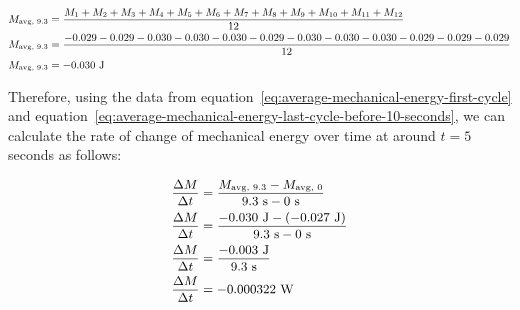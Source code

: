 \documentclass[titlepage]{article}
\begin{document}
            
            \begin{equation}
                \small
                \begin{aligned}
                    M_{\text{avg, 9.3}} &= \frac{M_1 + M_2 + M_3 + M_4 + M_5 + M_6 + M_7 + M_8 + M_9 + M_{10} + M_{11} + M_{12}}{12} \\
                    M_{\text{avg, 9.3}} &= \frac{-0.029 -0.029 -0.030 -0.030 -0.030 -0.029 -0.030 -0.030 -0.030 -0.029 -0.029 -0.029}{12} \\
                    M_{\text{avg, 9.3}} &= -0.030 \text{ J} \\
                \end{aligned}\label{eq:average-mechanical-energy-last-cycle-before-10-seconds}
            \end{equation}
            
            Therefore, using the data from equation~\ref{eq:average-mechanical-energy-first-cycle} and equation~\ref{eq:average-mechanical-energy-last-cycle-before-10-seconds}, we can calculate the rate of change of mechanical energy over time at around $t = 5$ seconds as follows:
            
            \begin{equation}
                \small
                \begin{aligned}
                    \frac{\Delta M}{\Delta t} &= \frac{M_{\text{avg, 9.3}} - M_{\text{avg, 0}}}{9.3 \text{ s} - 0 \text{ s}} \\
                    \frac{\Delta M}{\Delta t} &= \frac{-0.030 \text{ J} - (-0.027 \text{ J})}{9.3 \text{ s} - 0 \text{ s}} \\
                    \frac{\Delta M}{\Delta t} &= \frac{-0.003 \text{ J}}{9.3 \text{ s}} \\
                    \frac{\Delta M}{\Delta t} &= -0.000322 \text{ W} \\
                \end{aligned}\label{eq:rate-of-change-of-mechanical-energy-over-time}
            \end{equation}
            
\end{document}
